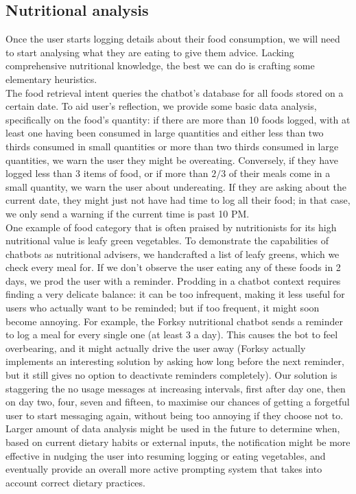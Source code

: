 \subsection{Nutritional analysis}
Once the user starts logging details about their food consumption, we will need to start analysing what they are eating to give them advice. Lacking comprehensive nutritional knowledge, the best we can do is crafting some elementary heuristics. \\
The food retrieval intent queries the chatbot's database for all foods stored on a certain date. To aid user's reflection, we provide some basic data analysis, specifically on the food's quantity: if there are more than 10 foods logged, with at least one having been consumed in large quantities and either less than two thirds consumed in small quantities or more than two thirds consumed in large quantities, we warn the user they might be overeating. Conversely, if they have logged less than 3 items of food, or if more than $2/3$ of their meals come in a small quantity, we warn the user about undereating. If they are asking about the current date, they might just not have had time to log all their food; in that case, we only send a warning if the current time is past 10 PM.\\
One example of food category that is often praised by nutritionists for its high nutritional value \cite{} is leafy green vegetables. To demonstrate the capabilities of chatbots as nutritional advisers, we handcrafted a list of leafy greens, which we check every meal for. If we don't observe the user eating any of these foods in 2 days, we prod the user with a reminder. Prodding in a chatbot context requires finding a very delicate balance: it can be too infrequent, making it less useful for users who actually want to be reminded; but if too frequent, it  might soon become annoying. For example, the Forksy nutritional chatbot \cite{} sends a reminder to log a meal for every single one (at least 3 a day). This causes the bot to feel overbearing, and it might actually drive the user away (Forksy actually implements an interesting solution by asking how long before the next reminder, but it still gives no option to deactivate reminders completely). Our solution is staggering the no usage messages at increasing intervals, first after day one, then on day two, four, seven and fifteen, to maximise our chances of getting a forgetful user to start messaging again, without being too annoying if they choose not to. Larger amount of data analysis might be used in the future to determine when, based on current dietary habits or external inputs, the notification might be more effective in nudging the user into resuming logging or eating vegetables, and eventually provide an overall more active prompting system that takes into account correct dietary practices.

